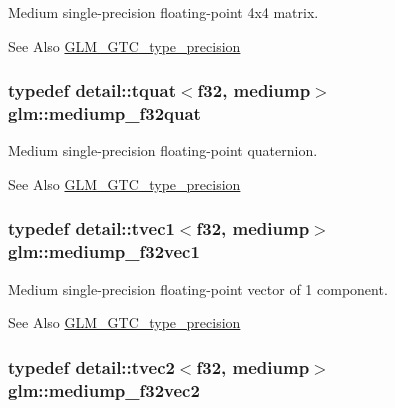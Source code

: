 Medium single-\/precision floating-\/point 4x4 matrix. \begin{DoxySeeAlso}{See Also}
\hyperlink{group__gtc__type__precision}{G\-L\-M\-\_\-\-G\-T\-C\-\_\-type\-\_\-precision} 
\end{DoxySeeAlso}
\hypertarget{group__gtc__type__precision_gab038e3482ca401bca2b2634c96f44f09}{
\subsubsection[{mediump\-\_\-f32quat}]{\setlength{\rightskip}{0pt plus 5cm}typedef detail\-::tquat$<$f32, mediump$>$ {\bf glm\-::mediump\-\_\-f32quat}}}\label{group__gtc__type__precision_gab038e3482ca401bca2b2634c96f44f09}
Medium single-\/precision floating-\/point quaternion. \begin{DoxySeeAlso}{See Also}
\hyperlink{group__gtc__type__precision}{G\-L\-M\-\_\-\-G\-T\-C\-\_\-type\-\_\-precision} 
\end{DoxySeeAlso}
\hypertarget{group__gtc__type__precision_gaf3d4077b241fbcab529fb0e0d88c0df6}{
\subsubsection[{mediump\-\_\-f32vec1}]{\setlength{\rightskip}{0pt plus 5cm}typedef detail\-::tvec1$<$f32, mediump$>$ {\bf glm\-::mediump\-\_\-f32vec1}}}\label{group__gtc__type__precision_gaf3d4077b241fbcab529fb0e0d88c0df6}
Medium single-\/precision floating-\/point vector of 1 component. \begin{DoxySeeAlso}{See Also}
\hyperlink{group__gtc__type__precision}{G\-L\-M\-\_\-\-G\-T\-C\-\_\-type\-\_\-precision} 
\end{DoxySeeAlso}
\hypertarget{group__gtc__type__precision_gaf53d380f948fdbb540eab960f2ad4b58}{
\subsubsection[{mediump\-\_\-f32vec2}]{\setlength{\rightskip}{0pt plus 5cm}typedef detail\-::tvec2$<$f32, mediump$>$ {\bf glm\-::mediump\-\_\-f32vec2}}}\label{group__gtc__type__precision_gaf53d380f948fdbb540eab960f2ad4b58}
